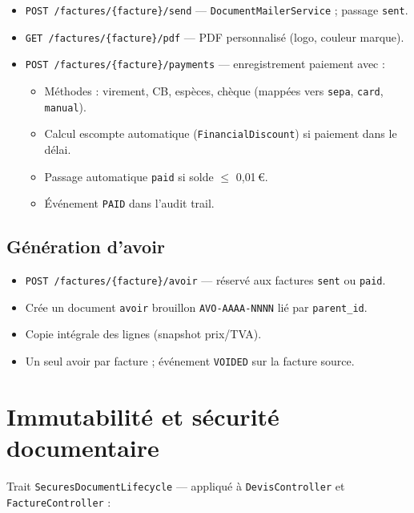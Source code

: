 \documentclass[11pt,a4paper]{report}
\newcommand{\route}[1]{\texttt{\small #1}}
\newcommand{\ctrl}[1]{\texttt{\small #1}}
\newcommand{\svc}[1]{\texttt{\small #1}}
\begin{document}
\begin{itemize}[leftmargin=*]
    \item \route{POST /factures/\{facture\}/send} — \svc{DocumentMailerService} ; passage \texttt{sent}.
    \item \route{GET /factures/\{facture\}/pdf} — PDF personnalisé (logo, couleur marque).
    \item \route{POST /factures/\{facture\}/payments} — enregistrement paiement avec :
    \begin{itemize}
        \item Méthodes : virement, CB, espèces, chèque (mappées vers \texttt{sepa}, \texttt{card}, \texttt{manual}).
        \item Calcul escompte automatique (\svc{FinancialDiscount}) si paiement dans le délai.
        \item Passage automatique \texttt{paid} si solde $\leq$ 0{,}01\,€.
        \item Événement \texttt{PAID} dans l'audit trail.
    \end{itemize}
\end{itemize}

\subsection{Génération d'avoir}

\begin{itemize}[leftmargin=*]
    \item \route{POST /factures/\{facture\}/avoir} — réservé aux factures \texttt{sent} ou \texttt{paid}.
    \item Crée un document \texttt{avoir} brouillon \texttt{AVO-AAAA-NNNN} lié par \texttt{parent\_id}.
    \item Copie intégrale des lignes (snapshot prix/TVA).
    \item Un seul avoir par facture ; événement \texttt{VOIDED} sur la facture source.
\end{itemize}

\section{Immutabilité et sécurité documentaire}

Trait \ctrl{SecuresDocumentLifecycle} — appliqué à \ctrl{DevisController} et \ctrl{FactureController} :
\end{document}
